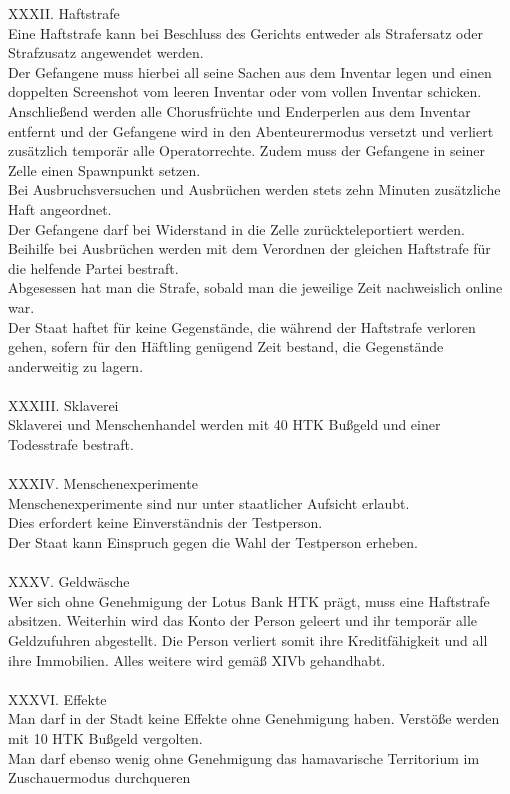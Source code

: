 \documentclass{article}
\begin{document}
XXXII. Haftstrafe\\Eine Haftstrafe kann bei Beschluss des Gerichts entweder als Strafersatz oder Strafzusatz angewendet werden.\\Der Gefangene muss hierbei all seine Sachen aus dem Inventar legen und einen doppelten Screenshot vom leeren Inventar oder vom vollen Inventar schicken.\\Anschließend werden alle Chorusfrüchte und Enderperlen aus dem Inventar entfernt und der Gefangene wird in den Abenteurermodus versetzt und verliert zusätzlich temporär alle Operatorrechte. Zudem muss der Gefangene in seiner Zelle einen Spawnpunkt setzen.\\Bei Ausbruchsversuchen und Ausbrüchen werden stets zehn Minuten zusätzliche Haft angeordnet.\\Der Gefangene darf bei Widerstand in die Zelle zurückteleportiert werden.\\Beihilfe bei Ausbrüchen werden mit dem Verordnen der gleichen Haftstrafe für die helfende Partei bestraft.\\Abgesessen hat man die Strafe, sobald man die jeweilige Zeit nachweislich online war.\\Der Staat haftet für keine Gegenstände, die während der Haftstrafe verloren gehen, sofern für den Häftling genügend Zeit bestand, die Gegenstände anderweitig zu lagern.
\\\\
XXXIII. Sklaverei\\Sklaverei und Menschenhandel werden mit 40 HTK Bußgeld und einer Todesstrafe bestraft.\\ 
\\
XXXIV. Menschenexperimente\\Menschenexperimente sind nur unter staatlicher Aufsicht erlaubt.\\Dies erfordert keine Einverständnis der Testperson.\\Der Staat kann Einspruch gegen die Wahl der Testperson erheben.
\\\\
XXXV. Geldwäsche\\Wer sich ohne Genehmigung der Lotus Bank HTK prägt, muss eine Haftstrafe absitzen. Weiterhin wird das Konto der Person geleert und ihr temporär alle Geldzufuhren abgestellt. Die Person verliert somit ihre Kreditfähigkeit und all ihre Immobilien. Alles weitere wird gemäß XIVb gehandhabt.
\\\\
XXXVI. Effekte\\Man darf in der Stadt keine Effekte ohne Genehmigung haben. Verstöße werden mit 10 HTK Bußgeld vergolten.\\Man darf ebenso wenig ohne Genehmigung das hamavarische Territorium im Zuschauermodus durchqueren
\end{document}
